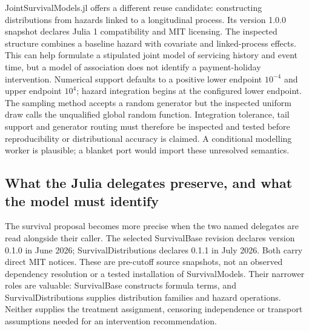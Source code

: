 JointSurvivalModels.jl offers a different reuse candidate: constructing distributions
from hazards linked to a longitudinal process. Its version 1.0.0 snapshot declares
Julia 1 compatibility and MIT licensing. The inspected structure combines a baseline
hazard with covariate and linked-process effects. This can help formulate a stipulated
joint model of servicing history and event time, but a model of association does not
identify a payment-holiday intervention. Numerical support defaults to a positive
lower endpoint $10^{-4}$ and upper endpoint $10^4$; hazard integration begins at
the configured lower endpoint. The sampling method accepts a random generator but
the inspected uniform draw calls the unqualified global random function. Integration
tolerance, tail support and generator routing must therefore be inspected and tested
before reproducibility or distributional accuracy is claimed. A conditional modelling
worker is plausible; a blanket port would import these unresolved semantics.
\citep{exec24_survivalother_juliajoint}

\subsection{What the Julia delegates preserve, and what the model must identify}
\label{rel22:survival-delegates}

The survival proposal becomes more precise when the two named delegates are
read alongside their caller. The selected SurvivalBase revision declares
version 0.1.0 in June 2026; SurvivalDistributions declares 0.1.1 in July 2026.
Both carry direct MIT notices. These are pre-cutoff source snapshots, not an
observed dependency resolution or a tested installation of SurvivalModels.
Their narrower roles are valuable: SurvivalBase constructs formula terms,
and SurvivalDistributions supplies distribution families and hazard operations.
Neither supplies the treatment assignment, censoring independence or
transport assumptions needed for an intervention recommendation.
\citep{rel22survbase,rel22survdist,rel22survcaller}

